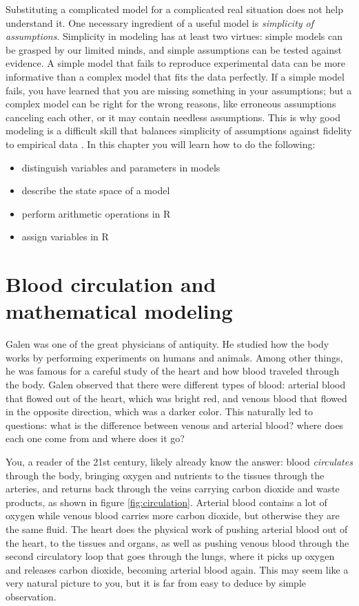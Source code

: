 \documentclass[
]{book}
\theoremstyle{definition}
\theoremstyle{definition}
\theoremstyle{definition}
\theoremstyle{remark}
\begin{document}
Substituting a complicated model for a complicated real situation does not help understand it. One necessary ingredient of a useful model is \emph{simplicity of assumptions}. Simplicity in modeling has at least two virtues: simple models can be grasped by our limited minds, and simple assumptions can be tested against evidence. A simple model that fails to reproduce experimental data can be more informative than a complex model that fits the data perfectly. If a simple model fails, you have learned that you are missing something in your assumptions; but a complex model can be right for the wrong reasons, like erroneous assumptions canceling each other, or it may contain needless assumptions. This is why good modeling is a difficult skill that balances simplicity of assumptions against fidelity to empirical data \citep{cohen_mathematics_2004}. In this chapter you will learn how to do the following:

\begin{itemize}
\item
  distinguish variables and parameters in models
\item
  describe the state space of a model
\item
  perform arithmetic operations in R
\item
  assign variables in R
\end{itemize}

\hypertarget{sec:bio1}{%
\section{Blood circulation and mathematical modeling}\label{sec:bio1}}

Galen  was one of the great physicians of antiquity. He studied how the body works by performing experiments on humans and animals. Among other things, he was famous for a careful study of the heart and how blood traveled through the body. Galen observed that there were different types of blood: arterial blood that flowed out of the heart, which was bright red, and venous blood that flowed in the opposite direction, which was a darker color. This naturally led to questions: what is the difference between venous and arterial blood? where does each one come from and where does it go?

You, a reader of the 21st century, likely already know the answer: blood \emph{circulates} through the body, bringing oxygen and nutrients to the tissues through the arteries, and returns back through the veins carrying carbon dioxide and waste products, as shown in figure \ref{fig:circulation}. Arterial blood contains a lot of oxygen while venous blood carries more carbon dioxide, but otherwise they are the same fluid. The heart does the physical work of pushing arterial blood out of the heart, to the tissues and organs, as well as pushing venous blood through the second circulatory loop that goes through the lungs, where it picks up oxygen and releases carbon dioxide, becoming arterial blood again. This may seem like a very natural picture to you, but it is far from easy to deduce by simple observation.
\end{document}
